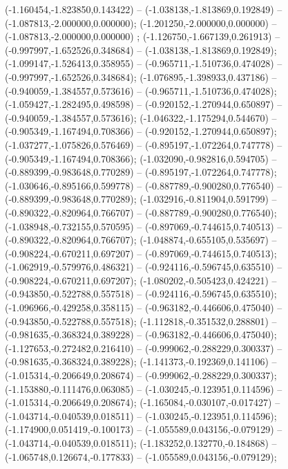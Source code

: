  (-1.160454,-1.823850,0.143422) -- (-1.038138,-1.813869,0.192849) -- (-1.087813,-2.000000,0.000000);
 (-1.201250,-2.000000,0.000000) -- (-1.087813,-2.000000,0.000000) ;
 (-1.126750,-1.667139,0.261913) -- (-0.997997,-1.652526,0.348684) -- (-1.038138,-1.813869,0.192849);
 (-1.099147,-1.526413,0.358955) -- (-0.965711,-1.510736,0.474028) -- (-0.997997,-1.652526,0.348684);
 (-1.076895,-1.398933,0.437186) -- (-0.940059,-1.384557,0.573616) -- (-0.965711,-1.510736,0.474028);
 (-1.059427,-1.282495,0.498598) -- (-0.920152,-1.270944,0.650897) -- (-0.940059,-1.384557,0.573616);
 (-1.046322,-1.175294,0.544670) -- (-0.905349,-1.167494,0.708366) -- (-0.920152,-1.270944,0.650897);
 (-1.037277,-1.075826,0.576469) -- (-0.895197,-1.072264,0.747778) -- (-0.905349,-1.167494,0.708366);
 (-1.032090,-0.982816,0.594705) -- (-0.889399,-0.983648,0.770289) -- (-0.895197,-1.072264,0.747778);
 (-1.030646,-0.895166,0.599778) -- (-0.887789,-0.900280,0.776540) -- (-0.889399,-0.983648,0.770289);
 (-1.032916,-0.811904,0.591799) -- (-0.890322,-0.820964,0.766707) -- (-0.887789,-0.900280,0.776540);
 (-1.038948,-0.732155,0.570595) -- (-0.897069,-0.744615,0.740513) -- (-0.890322,-0.820964,0.766707);
 (-1.048874,-0.655105,0.535697) -- (-0.908224,-0.670211,0.697207) -- (-0.897069,-0.744615,0.740513);
 (-1.062919,-0.579976,0.486321) -- (-0.924116,-0.596745,0.635510) -- (-0.908224,-0.670211,0.697207);
 (-1.080202,-0.505423,0.424221) -- (-0.943850,-0.522788,0.557518) -- (-0.924116,-0.596745,0.635510);
 (-1.096966,-0.429258,0.358115) -- (-0.963182,-0.446606,0.475040) -- (-0.943850,-0.522788,0.557518);
 (-1.112818,-0.351532,0.288801) -- (-0.981635,-0.368324,0.389228) -- (-0.963182,-0.446606,0.475040);
 (-1.127653,-0.272482,0.216410) -- (-0.999062,-0.288229,0.300337) -- (-0.981635,-0.368324,0.389228);
 (-1.141373,-0.192369,0.141106) -- (-1.015314,-0.206649,0.208674) -- (-0.999062,-0.288229,0.300337);
 (-1.153880,-0.111476,0.063085) -- (-1.030245,-0.123951,0.114596) -- (-1.015314,-0.206649,0.208674);
 (-1.165084,-0.030107,-0.017427) -- (-1.043714,-0.040539,0.018511) -- (-1.030245,-0.123951,0.114596);
 (-1.174900,0.051419,-0.100173) -- (-1.055589,0.043156,-0.079129) -- (-1.043714,-0.040539,0.018511);
 (-1.183252,0.132770,-0.184868) -- (-1.065748,0.126674,-0.177833) -- (-1.055589,0.043156,-0.079129);
